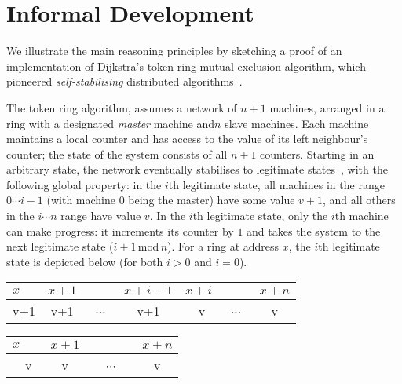 \section{Informal Development}
\label{sec:intuition}

We illustrate the main \colosl reasoning principles by sketching a
proof of an implementation of Dijkstra's token ring mutual exclusion
algorithm, which pioneered \emph{self-stabilising} distributed
algorithms~\cite{dijkstra74}.

The token ring algorithm, %
assumes a network of $n{+}1$ machines, arranged in a ring with a designated \emph{master} machine and$n$ slave machines. Each machine maintains a local counter and has
access to the value of its left neighbour's counter; the state of the
system consists of all $n{+}1$ counters. Starting in an arbitrary state,
the network eventually stabilises to legitimate
states~\cite{dijkstra-proof}, with the following global property: 
in the $i$th legitimate state, all machines in the range $0\cdots i{-}1$ (with machine $0$ being the master) have some value $v{+}1$, and all others in the $i \cdots n$ range have value $v$.  In the $i$th legitimate state, only the $i$th machine can make progress: it increments its counter by $1$ and takes the system to the next legitimate state ($i{+}1 \,\text{mod}\, n$). For a ring at address $x$, the $i$th legitimate state is depicted below (for both $i>0$ and $i=0$).  \\ \null\hfill
  \begin{tabular}{lllllll}
    $x$&$x{+}1$&&$x{+}i{-}1$&$x{+}i$&&$x{+}n$
    \\
    \hline
    \multicolumn{1}{|c|}{v+1} &
    \multicolumn{1}{|c|}{v+1} &
    \multicolumn{1}{|c|}{~$\cdots$~} &
    \multicolumn{1}{|c|}{v+1} &
    \multicolumn{1}{|c|}{~~v~\raisebox{1ex}{$\bullet$}} &
    \multicolumn{1}{|c|}{~$\cdots$~} &
    \multicolumn{1}{|c|}{v}\\
    \hline
  \end{tabular}\hfill
  \begin{tabular}{lllllll}
    $x$&$x{+}1$&&&&&$x{+}n$\\
    \hline
    \multicolumn{1}{|c|}{~~v~\raisebox{1ex}{$\bullet$}} &
    \multicolumn{1}{|c|}{v} &
    \multicolumn{4}{|c|}{~$\cdots$~} &
    \multicolumn{1}{|c|}{v}\\
    \hline
  \end{tabular}
  \hfill\null\\


